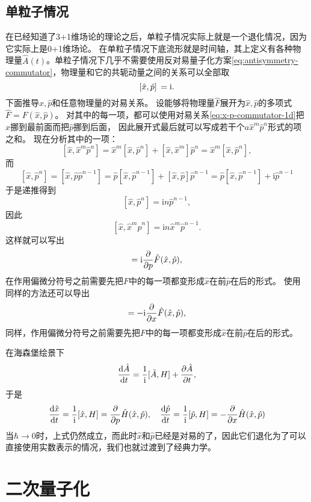 \documentclass[hyperref, UTF8, a4paper]{ctexart}
\newcommand*{\ii}{\mathrm{i}}
\begin{document}
\subsection{单粒子情况}

在已经知道了3+1维场论的理论之后，单粒子情况实际上就是一个退化情况，因为它实际上是0+1维场论。
在单粒子情况下底流形就是时间轴，其上定义有各种物理量$\hat{A}(t)$。单粒子情况下几乎不需要使用反对易量子化方案\eqref{eq:antisymmetry-commutator}，物理量和它的共轭动量之间的关系可以全部取
\begin{equation}
    \comm*{\hat{x}}{\hat{p}} = \ii.
\end{equation}
下面推导$\hat{x}, \hat{p}$和任意物理量的对易关系。
设能够将物理量$\hat{F}$展开为$\hat{x}, \hat{p}$的多项式$\hat{F} = F(\hat{x}, \hat{p})$。
对其中的每一项，都可以使用对易关系\eqref{eq:x-p-commutator-1d}把$\hat{x}$挪到最前面而把$\hat{p}$挪到后面，
因此展开式最后就可以写成若干个$a \hat{x}^m \hat{p}^n$形式的项之和。
现在分析其中的一项：
\[
    [\hat{x}, \hat{x}^m \hat{p}^n] = \hat{x}^m [\hat{x}, \hat{p}^n] + [\hat{x}, \hat{x}^m] \hat{p}^n = \hat{x}^m [\hat{x}, \hat{p}^n],
\]
而
\[
    [\hat{x}, \hat{p}^n] = [\hat{x}, \hat{p} \hat{p}^{n-1}] = 
    \hat{p} [\hat{x}, \hat{p}^{n-1}] + [\hat{x}, \hat{p}] \hat{p}^{n-1} = \hat{p} [\hat{x}, \hat{p}^{n-1}] + \ii \hat{p}^{n-1}
\]
于是递推得到
\[
    [\hat{x}, \hat{p}^n] = \ii n \hat{p}^{n-1},
\]
因此
\[
    [\hat{x}, \hat{x}^m \hat{p}^n] = \ii n \hat{x}^m \hat{p}^{n-1}.
\]
这样就可以写出
\begin{equation}
    [\hat{x}, \hat{F}(\hat{x}, \hat{p})] = \ii \pdv{p} \hat{F}(\hat{x}, \hat{p}),
\end{equation}
在作用偏微分符号之前需要先把$F$中的每一项都变形成$\hat{x}$在前$\hat{p}$在后的形式。
使用同样的方法还可以导出
\begin{equation}
    [\hat{p}, \hat{F}(\hat{x}, \hat{p})] = - \ii \pdv{x} \hat{F}(\hat{x}, \hat{p}),
\end{equation}
同样，作用偏微分符号之前需要先把$F$中的每一项都变形成$\hat{x}$在前$\hat{p}$在后的形式。

在海森堡绘景下
\[
    \dv{\hat{A}}{t} = \frac{1}{\ii} [\hat{A}, H] + \pdv{\hat{A}}{t},
\]
于是
\[
    \dv{\hat{x}}{t} = \frac{1}{\ii} [\hat{x}, H] = \pdv{p} \hat{H}(\hat{x}, \hat{p}), \quad
    \dv{\hat{p}}{t} = \frac{1}{\ii} [\hat{p}, H] = -\pdv{x} \hat{H}(\hat{x}, \hat{p})
\]
当$\hbar \to 0$时，上式仍然成立，而此时$\hat{x}$和$\hat{p}$已经是对易的了，因此它们退化为了可以直接使用实数表示的情况，我们也就过渡到了经典力学。

\section{二次量子化}\label{sec:second-quantization}
\end{document}
